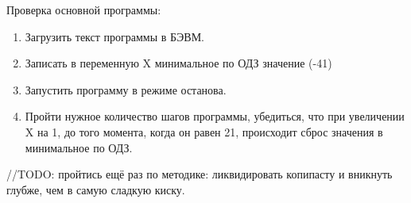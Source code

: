Проверка основной программы:
\begin{enumerate}
    \item Загрузить текст программы в БЭВМ.
    \item Записать в переменную X минимальное по ОДЗ значение (-41)
    \item Запустить программу в режиме останова.
    \item Пройти нужное количество шагов программы, убедиться, что при увеличении X на 1, до того момента, когда он равен 21, происходит сброс значения в
минимальное по ОДЗ.
\end{enumerate}

//TODO: пройтись ещё раз по методике: ликвидировать копипасту и вникнуть глубже, чем в самую сладкую киску.